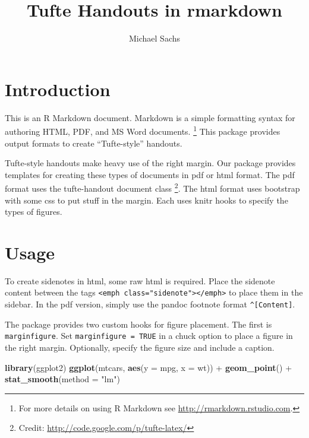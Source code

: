 \documentclass{tufte-handout}
\title{Tufte Handouts in rmarkdown}
\author{Michael Sachs}
\newenvironment{Shaded}{}{}
\newcommand{\KeywordTok}[1]{\textcolor[rgb]{0.00,0.44,0.13}{\textbf{{#1}}}}
\newcommand{\DataTypeTok}[1]{\textcolor[rgb]{0.56,0.13,0.00}{{#1}}}
\newcommand{\StringTok}[1]{\textcolor[rgb]{0.25,0.44,0.63}{{#1}}}
\newcommand{\NormalTok}[1]{{#1}}
\begin{document}
\maketitle

\section{Introduction}\label{introduction}

This is an R Markdown document. Markdown is a simple formatting syntax
for authoring HTML, PDF, and MS Word documents. \footnote{For more
  details on using R Markdown see \url{http://rmarkdown.rstudio.com}.}
This package provides output formats to create ``Tufte-style'' handouts.

Tufte-style handouts make heavy use of the right margin. Our package
provides templates for creating these types of documents in pdf or html
format. The pdf format uses the tufte-handout document class \footnote{Credit:
  \url{http://code.google.com/p/tufte-latex/}}. The html format uses
bootstrap with some css to put stuff in the margin. Each uses knitr
hooks to specify the types of figures.

\section{Usage}\label{usage}

To create sidenotes in html, some raw html is required. Place the
sidenote content between the tags
\texttt{\textless{}emph class="sidenote"\textgreater{}\textless{}/emph\textgreater{}}
to place them in the sidebar. In the pdf version, simply use the pandoc
footnote format \texttt{\^{}{[}Content{]}}.

The package provides two custom hooks for figure placement. The first is
\texttt{marginfigure}. Set \texttt{marginfigure = TRUE} in a chuck
option to place a figure in the right margin. Optionally, specify the
figure size and include a caption.

\begin{Shaded}
\begin{Highlighting}[]
\KeywordTok{library}\NormalTok{(ggplot2)}
\KeywordTok{ggplot}\NormalTok{(mtcars, }\KeywordTok{aes}\NormalTok{(}\DataTypeTok{y =} \NormalTok{mpg, }\DataTypeTok{x =} \NormalTok{wt)) +}\StringTok{ }\KeywordTok{geom_point}\NormalTok{() +}\StringTok{ }
\StringTok{    }\KeywordTok{stat_smooth}\NormalTok{(}\DataTypeTok{method =} \StringTok{"lm"}\NormalTok{)}
\end{Highlighting}
\end{Shaded}
\end{document}
